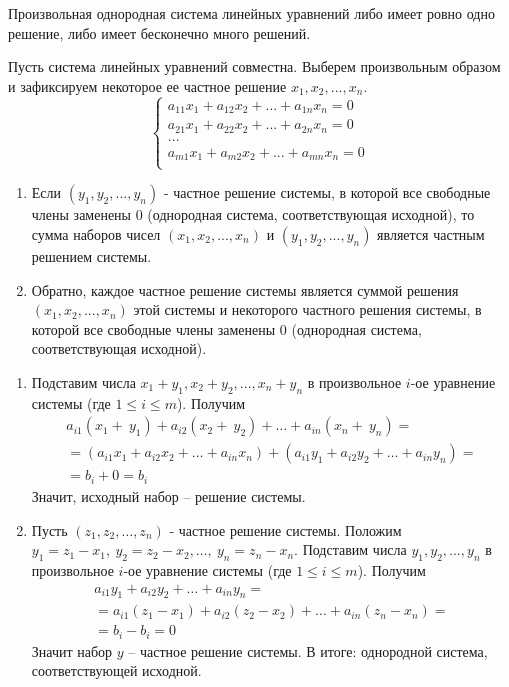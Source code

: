 \documentclass[a4paper,14pt]{article}
\begin{document}
\begin{corollary}
	Произвольная однородная система линейных уравнений либо имеет ровно одно решение, либо имеет бесконечно много решений.
\end{corollary}
\begin{theorem}
	Пусть система линейных уравнений совместна. Выберем произвольным образом и зафиксируем некоторое ее частное решение $x_1, x_2, ..., x_n$.
	\[
	\begin{cases}
	a_{11}x_1 + a_{12}x_2 + ... + a_{1n}x_n = 0 \\
	a_{21}x_1 + a_{22}x_2 + ... + a_{2n}x_n = 0 \\
	... \\
	a_{m1}x_1 + a_{m2}x_2 + ... + a_{mn}x_n = 0 \\
	\end{cases}
	\]
	\begin{enumerate}
		\item Если $(y_1, y_2, ..., y_n)$ - частное решение системы, в которой все свободные члены заменены 0 (однородная система, соответствующая исходной), то сумма наборов чисел $(x_1, x_2, ..., x_n)$ и $(y_1, y_2, ..., y_n)$ является частным решением системы.
		\item Обратно, каждое частное решение системы является суммой решения $(x_1, x_2, ..., x_n)$ этой системы и некоторого частного решения системы, в которой все свободные члены заменены 0 (однородная система, соответствующая исходной).
	\end{enumerate}
	\begin{evidence} \leavevmode
		\begin{enumerate}
			\item Подставим числа $x_1 + y_1, x_2 + y_2, ..., x_n + y_n$ в произвольное $i$-ое уравнение системы (где $1 \le i \le m$). Получим
			\begin{multline}
			a_{i1}(x_1 +\ y_1)+a_{i2}(x_2 +\ y_2)+\ldots+a_{in}(x_n +\ y_n) = \\ =\left(a_{i1}x_1+a_{i2}x_2+\ldots+a_{in}x_n\right)+\left(a_{i1}y_1+a_{i2}y_2+\ldots+a_{in}y_n\right)= \\ =b_i+0=b_i
			\end{multline} Значит, исходный набор – решение системы.
			\item Пусть $\left(z_1,z_2,\dots,z_n\right)$ - частное решение системы. Положим $y_1=z_1-x_1,\ y_2=z_2-x_2,\dots,\ y_n=z_n-x_n$. Подставим числа $y_1, y_2, ..., y_n$ в произвольное $i$-ое уравнение системы (где $1 \le i \le m$). Получим
			\begin{multline}
			a_{i1}y_1+a_{i2}y_2+\dots+a_{in}y_n = \\ =a_{i1}\left(z_1-x_1\right)+a_{i2}\left(z_2-x_2\right)+\dots+a_{in}\left(z_n-x_n\right)= \\ =b_i-b_i=0
			\end{multline} Значит набор $y$ – частное решение системы. В итоге: однородной система, соответствующей исходной.
		\end{enumerate}	
	\end{evidence}
\end{theorem}
\end{document}

